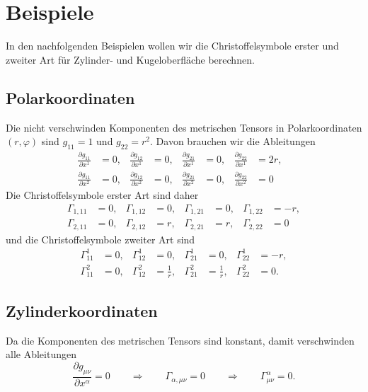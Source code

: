 \section{Beispiele}
In den nachfolgenden Beispielen wollen wir die Christoffelsymbole erster
und zweiter Art für Zylinder- und Kugeloberfläche berechnen.

\subsection{Polarkoordinaten}
Die nicht verschwinden Komponenten
des metrischen Tensors in Polarkoordinaten $(r,\varphi)$
sind $g_{11}=1$ und $g_{22}=r^2$.
Davon brauchen wir die Ableitungen
\[
\begin{aligned}
\frac{\partial g_{11}}{\partial x^1} &=0,&
\frac{\partial g_{12}}{\partial x^1} &=0,&
\frac{\partial g_{21}}{\partial x^1} &=0,&
\frac{\partial g_{22}}{\partial x^1} &=2r,&
\\
\frac{\partial g_{11}}{\partial x^2} &=0,&
\frac{\partial g_{12}}{\partial x^2} &=0,&
\frac{\partial g_{21}}{\partial x^2} &=0,&
\frac{\partial g_{22}}{\partial x^2} &=0
\end{aligned}
\]
Die Christoffelsymbole erster Art sind daher 
\[
\begin{aligned}
\Gamma_{1,11} &=  0,&
\Gamma_{1,12} &=  0,&
\Gamma_{1,21} &=  0,&
\Gamma_{1,22} &= -r,
\\
\Gamma_{2,11} &=  0,&
\Gamma_{2,12} &=  r,&
\Gamma_{2,21} &=  r,&
\Gamma_{2,22} &=  0
\end{aligned}
\]
und die Christoffelsymbole zweiter Art sind
\begin{equation}
\begin{aligned}
\Gamma_{11}^1 &= 0,&
\Gamma_{12}^1 &= 0,&
\Gamma_{21}^1 &= 0,&
\Gamma_{22}^1 &=-r,
\\
\Gamma_{11}^2 &= 0,&
\Gamma_{12}^2 &= \frac1{r},&
\Gamma_{21}^2 &= \frac1{r},&
\Gamma_{22}^2 &= 0.
\end{aligned}
\label{skript:geodaeten:christoffel:polar}
\end{equation}

\subsection{Zylinderkoordinaten}
Da die Komponenten des metrischen Tensors sind konstant, damit verschwinden
alle Ableitungen
\[
\frac{\partial g_{\mu\nu}}{\partial x^\alpha}=0
\qquad\Rightarrow\qquad
\Gamma_{\alpha,\mu\nu}=0
\qquad\Rightarrow\qquad
\Gamma_{\mu\nu}^\alpha=0.
\]

